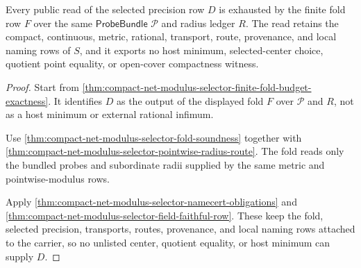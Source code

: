 \begin{theorem}
\label{thm:compact-net-modulus-selector-fold-consumer-exhaustion}
Every public read of the selected precision row $D$ is exhausted by the finite
fold row $F$ over the same $\mathsf{ProbeBundle}$ $\mathcal{P}$ and radius
ledger $R$. The read retains the compact, continuous, metric, rational,
transport, route, provenance, and local naming rows of $S$, and it exports no
host minimum, selected-center choice, quotient point equality, or open-cover
compactness witness.
\end{theorem}
\begin{proof}
Start from \autoref{thm:compact-net-modulus-selector-finite-fold-budget-exactness}.
It identifies $D$ as the output of the displayed fold $F$ over
$\mathcal{P}$ and $R$, not as a host minimum or external rational infimum.

Use \autoref{thm:compact-net-modulus-selector-fold-soundness} together with
\autoref{thm:compact-net-modulus-selector-pointwise-radius-route}. The fold
reads only the bundled probes and subordinate radii supplied by the same metric
and pointwise-modulus rows.

Apply \autoref{thm:compact-net-modulus-selector-namecert-obligations} and
\autoref{thm:compact-net-modulus-selector-field-faithful-row}. These keep the
fold, selected precision, transports, routes, provenance, and local naming rows
attached to the carrier, so no unlisted center, quotient equality, or host
minimum can supply $D$.
\end{proof}

